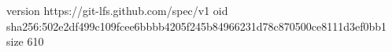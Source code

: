 version https://git-lfs.github.com/spec/v1
oid sha256:502e2df499c109fcee6bbbb4205f245b84966231d78c870500ce8111d3ef0bb1
size 610
